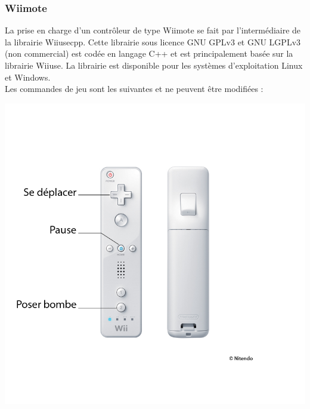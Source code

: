 \subsubsection{Wiimote}
La prise en charge d'un contrôleur de type Wiimote se fait par l'intermédiaire de la librairie Wiiusecpp. Cette librairie sous licence GNU GPLv3 et GNU LGPLv3 (non commercial) est codée en langage C++ et est principalement basée sur la librairie Wiiuse. La librairie est disponible pour les systèmes d'exploitation Linux et Windows.\\

Les commandes de jeu sont les suivantes et ne peuvent être modifiées :\\

\begin{center}
	\includegraphics[scale=1]{images/wiimote}
\end{center}